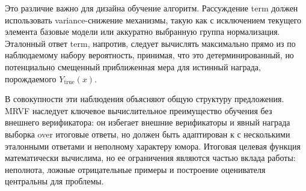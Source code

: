 Это различие важно для дизайна обучение алгоритм. Рассуждение term должен использовать variance-снижение механизмы, такую как с исключением текущего элемента базовые модели или аккуратно выбранную группа нормализация. Эталонный ответ term, напротив, следует вычислять максимально прямо из по наблюдаемому набору вероятность, принимая, что это детерминированный, но потенциально смещенный приближенная мера для истинный награда, порождаемого \(Y_{\mathrm{true}}(x)\).

В совокупности эти наблюдения объясняют общую структуру предложения. MRVF наследует ключевое вычислительное преимущество обучения без внешнего верификатора: он избегает внешние верификаторы и явный награда выборка over итоговые ответы, но должен быть адаптирован к с несколькими эталонными ответами и неполному характеру юмора. Итоговая целевая функция математически вычислима, но ее ограничения являются частью вклада работы: неполнота, ложные отрицательные примеры и построение оценивателя центральны для проблемы.
